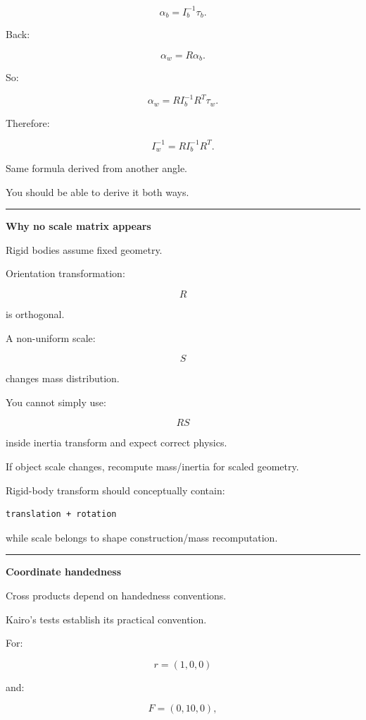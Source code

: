 \[
\alpha_b=I_b^{-1}\tau_b.
\]

Back:

\[
\alpha_w=R\alpha_b.
\]

So:

\[
\alpha_w
=
RI_b^{-1}R^T\tau_w.
\]

Therefore:

\[
I_w^{-1}
=
RI_b^{-1}R^T.
\]

Same formula derived from another angle.

You should be able to derive it both ways.

\begin{center}\rule{0.5\linewidth}{0.5pt}\end{center}

\textbf{Why no scale matrix appears}

Rigid bodies assume fixed geometry.

Orientation transformation:

\[
R
\]

is orthogonal.

A non-uniform scale:

\[
S
\]

changes mass distribution.

You cannot simply use:

\[
RS
\]

inside inertia transform and expect correct physics.

If object scale changes, recompute mass/inertia for scaled geometry.

Rigid-body transform should conceptually contain:

\begin{verbatim}
translation + rotation
\end{verbatim}

while scale belongs to shape construction/mass recomputation.

\begin{center}\rule{0.5\linewidth}{0.5pt}\end{center}

\textbf{Coordinate handedness}

Cross products depend on handedness conventions.

Kairo's tests establish its practical convention.

For:

\[
r=(1,0,0)
\]

and:

\[
F=(0,10,0),
\]


